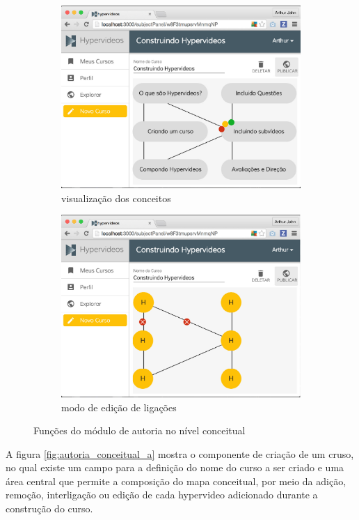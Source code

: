 \begin{figure}[h!]
	\begin{subfigure}{.5\textwidth}
  		\centering
  		\includegraphics[width=.9\linewidth]{figuras/autoria_conceitual_c.eps}
  		\caption{visualização dos conceitos}
  		\label{fig:autoria_conceitual_c}
	\end{subfigure}%
	\begin{subfigure}{.5\textwidth}
  		\centering
  		\includegraphics[width=.9\linewidth]{figuras/autoria_conceitual_d.eps}
  		\caption{modo de edição de ligações}
  		\label{fig:autoria_conceitual_d}
	\end{subfigure}%
  	\caption{Funções do módulo de autoria no nível conceitual}
  	\label{fig:autoria_conceitual}
\end{figure}

A figura \ref{fig:autoria_conceitual_a} mostra o componente de criação de um cruso, no qual existe um campo para a definição do nome do curso a ser criado e uma área central que permite a composição do mapa conceitual, por meio da adição, remoção, interligação ou edição de cada hypervideo adicionado durante a construção do curso. 

